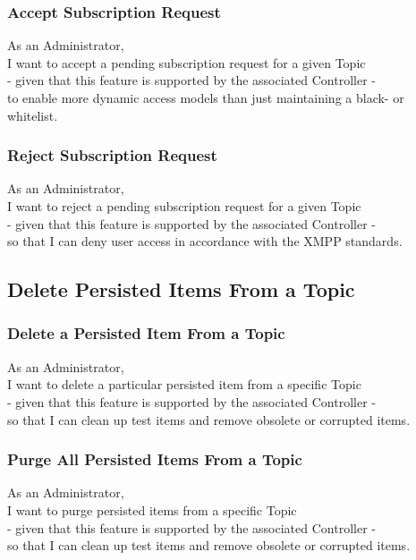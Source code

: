 \subsubsection{Accept Subscription Request}

As an Administrator,\\
I want to accept a pending subscription request for a given Topic\\
- given that this feature is supported by the associated Controller -\\
to enable more dynamic access models than just maintaining a black- or whitelist.

\subsubsection{Reject Subscription Request}

As an Administrator,\\
I want to reject a pending subscription request for a given Topic\\
- given that this feature is supported by the associated Controller -\\
so that I can deny user access in accordance with the XMPP standards.

\subsection{Delete Persisted Items From a Topic}

\subsubsection{Delete a Persisted Item From a Topic}

As an Administrator,\\
I want to delete a particular persisted item from a specific Topic\\
- given that this feature is supported by the associated Controller -\\
so that I can clean up test items and remove obsolete or corrupted items.

\subsubsection{Purge All Persisted Items From a Topic}

As an Administrator,\\
I want to purge persisted items from a specific Topic\\
- given that this feature is supported by the associated Controller -\\
so that I can clean up test items and remove obsolete or corrupted items.

